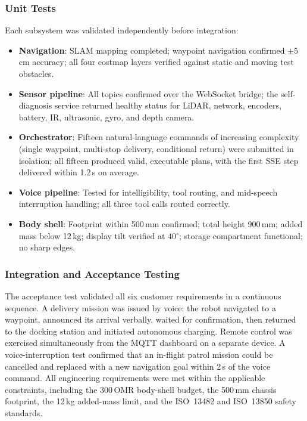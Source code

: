 \documentclass[11pt,a4paper]{article}
\begin{document}
\subsubsection{Unit Tests}

Each subsystem was validated independently before integration:
\begin{itemize}
  \item \textbf{Navigation}: SLAM mapping completed; waypoint navigation confirmed $\pm$5\,cm accuracy; all four costmap layers verified against static and moving test obstacles.
  \item \textbf{Sensor pipeline}: All topics confirmed over the WebSocket bridge; the self-diagnosis service returned healthy status for LiDAR, network, encoders, battery, IR, ultrasonic, gyro, and depth camera.
  \item \textbf{Orchestrator}: Fifteen natural-language commands of increasing complexity (single waypoint, multi-stop delivery, conditional return) were submitted in isolation; all fifteen produced valid, executable plans, with the first SSE step delivered within 1.2\,s on average.
  \item \textbf{Voice pipeline}: Tested for intelligibility, tool routing, and mid-speech interruption handling; all three tool calls routed correctly.
  \item \textbf{Body shell}: Footprint within 500\,mm confirmed; total height 900\,mm; added mass below 12\,kg; display tilt verified at 40$^{\circ}$; storage compartment functional; no sharp edges.
\end{itemize}

\subsubsection{Integration and Acceptance Testing}

The acceptance test validated all six customer requirements in a continuous sequence. A delivery mission was issued by voice: the robot navigated to a waypoint, announced its arrival verbally, waited for confirmation, then returned to the docking station and initiated autonomous charging. Remote control was exercised simultaneously from the MQTT dashboard on a separate device. A voice-interruption test confirmed that an in-flight patrol mission could be cancelled and replaced with a new navigation goal within 2\,s of the voice command. All engineering requirements were met within the applicable constraints, including the 300\,OMR body-shell budget, the 500\,mm chassis footprint, the 12\,kg added-mass limit, and the ISO~13482 and ISO~13850 safety standards.
\end{document}
